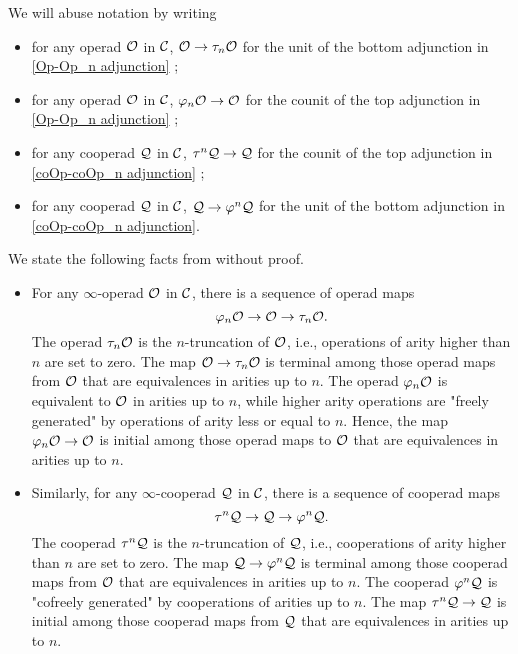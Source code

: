 \begin{notation}
	We will abuse notation by writing 
	\begin{itemize}
	    \item 
	    for any operad ${\mathcal{O}}$ in ${\mathcal{C}}$,
	${\mathcal{O}} \to \tau_{n} {\mathcal{O}}$
	for the unit of the bottom adjunction in \eqref{Op-Op_n adjunction} ;
	\item 
	for any operad ${\mathcal{O}}$ in ${\mathcal{C}}$,
	$
	\varphi_n {\mathcal{O}} \to {\mathcal{O}}
	$ for the counit of the top adjunction in \eqref{Op-Op_n adjunction} ;
	\item 	for any cooperad ${\mathcal{Q}}$ in ${\mathcal{C}}$, $\tau^n {\mathcal{Q}} \to {\mathcal{Q}}$ for the counit of the top adjunction in \eqref{coOp-coOp_n adjunction} ;
	\item 	
	for any cooperad ${\mathcal{Q}}$ in ${\mathcal{C}}$, 
	$
	{\mathcal{Q}} \to \varphi^n {\mathcal{Q}}
	$
	for the unit of the bottom adjunction in \eqref{coOp-coOp_n adjunction}.
	\end{itemize}
\end{notation}

We state the following facts from \cite{Heuts_Koszul} without proof.
\begin{fact}
\cite{Heuts_Koszul}
\begin{itemize}
	\item For any $\infty$-operad ${\mathcal{O}}$ in ${\mathcal{C}}$, there is a sequence of operad maps
	\[
	\varphi_n{\mathcal{O}} \to {\mathcal{O}} \to \tau_n {\mathcal{O}}.
	\]
	The operad $\tau_n{\mathcal{O}}$ is the $n$-truncation of ${\mathcal{O}}$, i.e., operations of arity higher than $n$ are set to zero.
	The map ${\mathcal{O}} \to \tau_n {\mathcal{O}}$ is terminal among those operad maps from ${\mathcal{O}}$ that are equivalences in arities up to $n$.
	The operad $\varphi_n{\mathcal{O}}$ is equivalent to ${\mathcal{O}}$ in arities up to $n$, while higher arity operations are "freely generated" by operations of arity less or equal to $n$.
	Hence, the map $\varphi_n{\mathcal{O}} \to {\mathcal{O}}$ is initial among those operad maps to ${\mathcal{O}}$ that are equivalences in arities up to $n$.

	\item Similarly, for any $\infty$-cooperad ${\mathcal{Q}}$ in ${\mathcal{C}}$, there is a sequence of  cooperad maps
	\[
	\tau^n {\mathcal{Q}} \to {\mathcal{Q}} \to \varphi^n {\mathcal{Q}}.
	\]
	The cooperad $\tau^n{\mathcal{Q}}$ is the $n$-truncation of ${\mathcal{Q}}$, i.e., cooperations of arity higher than $n$ are set to zero. The map ${\mathcal{Q}} \to \varphi^n{\mathcal{Q}}$ is terminal among those cooperad maps from ${\mathcal{O}}$ that are equivalences in arities up to $n$.
    The cooperad $\varphi^n {\mathcal{Q}}$ is "cofreely generated" by cooperations of arities up to $n$.
    The map $\tau^n{\mathcal{Q}} \to {\mathcal{Q}}$ is initial among those cooperad maps from ${\mathcal{Q}}$ that are equivalences in arities up to $n$.
\end{itemize}
\end{fact}

